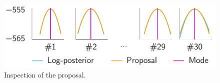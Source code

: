 \begin{figure}
  \centering
  \vspace{-1.5em}
  \includegraphics[width=0.8\linewidth]{include/figures/proposal.pdf}
  \caption{Inspection of the proposal.}
\end{figure}
